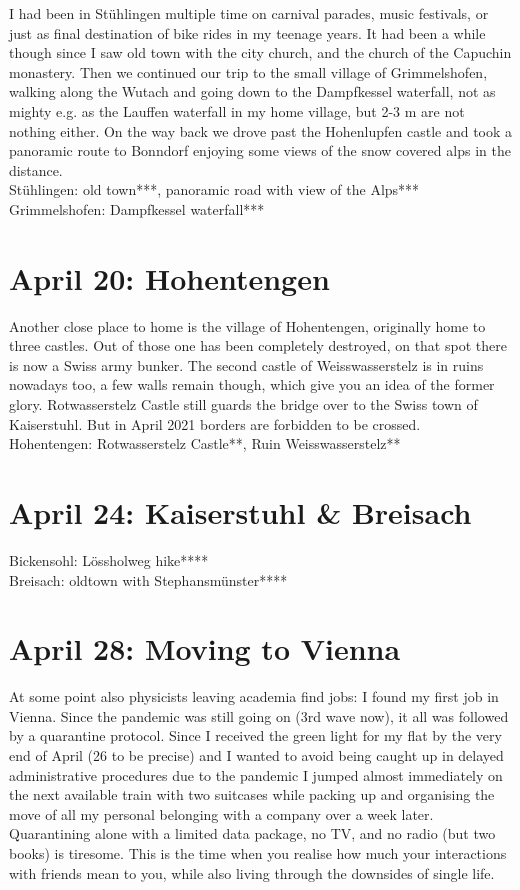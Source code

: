 I had been in St\"uhlingen multiple time on carnival parades, music festivals, or just as final destination of bike rides in my teenage years. It had been a while though since I saw old town with the city church, and the church of the Capuchin monastery. Then we continued our trip to the small village of Grimmelshofen, walking along the Wutach and going down to the Dampfkessel waterfall, not as mighty e.g. as the Lauffen waterfall in my home village, but 2-3 m are not nothing either. On the way back we drove past the Hohenlupfen castle and took a panoramic route to Bonndorf enjoying some views of the snow covered alps in the distance.\\

St\"uhlingen: old town***, panoramic road with view of the Alps***\\
Grimmelshofen: Dampfkessel waterfall***

\section{April 20: Hohentengen}
\label{2021Hohentengen}

Another close place to home is the village of Hohentengen, originally home to three castles. Out of those one has been completely destroyed, on that spot there is now a Swiss army bunker. The second castle of Weisswasserstelz is in ruins nowadays too, a few walls remain though, which give you an idea of the former glory. Rotwasserstelz Castle still guards the bridge over to the Swiss town of Kaiserstuhl. But in April 2021 borders are forbidden to be crossed.\\

Hohentengen: Rotwasserstelz Castle**, Ruin Weisswasserstelz**

\section{April 24: Kaiserstuhl \& Breisach}
\label{2021Kaiserstuhl}

Bickensohl: L\"ossholweg hike****\\
Breisach: oldtown with Stephansm\"unster****

\section{April 28: Moving to Vienna}
\label{moveVienna}

At some point also physicists leaving academia find jobs: I found my first job in Vienna. Since the pandemic was still going on (3rd wave now), it all was followed by a quarantine protocol. Since I received the green light for my flat by the very end of April (26 to be precise) and I wanted to avoid being caught up in delayed administrative procedures due to the pandemic I jumped almost immediately on the next available train with two suitcases while packing up and organising the move of all my personal belonging with a company over a week later. Quarantining alone with a limited data package, no TV, and no radio (but two books) is tiresome. This is the time when you realise how much your interactions with friends mean to you, while also living through the downsides of single life.

